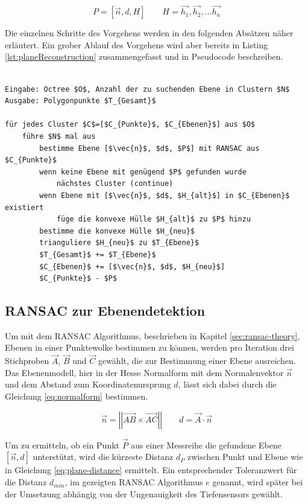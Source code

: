 \begin{equation} \label{eq:plane}
P=\left[\vec{n}, d, H\right] \qquad H=\vec{h_1}, \vec{h_2}, \ldots  \vec{h_n}
\end{equation}

Die einzelnen Schritte des Vorgehens werden in den folgenden Absätzen näher erläutert. Ein grober Ablauf des Vorgehens wird aber bereits in Listing \ref{lst:planeReconstruction} zusammengefasst und in Pseudocode beschreiben. 

\begin{lstlisting}[mathescape,caption=Planare Echtzeitrekonstruktion, label=lst:planeReconstruction, float=htbp]

Eingabe: Octree $O$, Anzahl der zu suchenden Ebene in Clustern $N$
Ausgabe: Polygonpunkte $T_{Gesamt}$

für jedes Cluster $C$=[$C_{Punkte}$, $C_{Ebenen}$] aus $O$
    führe $N$ mal aus
        bestimme Ebene [$\vec{n}$, $d$, $P$] mit RANSAC aus $C_{Punkte}$
        wenn keine Ebene mit genügend $P$ gefunden wurde
            nächstes Cluster (continue)
        wenn Ebene mit [$\vec{n}$, $d$, $H_{alt}$] in $C_{Ebenen}$ existiert	
            füge die konvexe Hülle $H_{alt}$ zu $P$ hinzu	
        bestimme die konvexe Hülle $H_{neu}$
        trianguliere $H_{neu}$ zu $T_{Ebene}$
        $T_{Gesamt}$ += $T_{Ebene}$
        $C_{Ebenen}$ += [$\vec{n}$, $d$, $H_{neu}$]
        $C_{Punkte}$ - $P$
\end{lstlisting}


\subsection{RANSAC zur Ebenendetektion} \label{sec:ransac}

Um mit dem RANSAC Algorithmus, beschrieben in Kapitel \ref{sec:ransac-theory}, Ebenen in einer Punktewolke bestimmen zu können, werden pro Iteration drei Stichproben \(\vec{A}\), \(\vec{B}\) und \(\vec{C}\) gewählt, die zur Bestimmung einer Ebene ausreichen. Das Ebenenmodell, hier in der Hesse Normalform mit dem Normalenvektor \(\vec{n}\) und dem Abstand zum Koordinatenursprung \(d\), lässt sich dabei durch die Gleichung \ref{eq:normalform} bestimmen.

\begin{equation}\label{eq:normalform}
\vec{n} =\left|\left| \vec{AB} \times \vec{AC}\right|\right|
\qquad
d = \vec{A} \cdot \vec{n}
\end{equation}

Um zu ermitteln, ob ein Punkt \(\vec{P}\) aus einer Messreihe die gefundene Ebene \(\left[\vec{n}, d\right]\) unterstützt, wird die kürzeste Distanz \(d_P\) zwischen Punkt und Ebene wie in Gleichung \ref{eq:plane-distance} ermittelt.  Ein entsprechender Toleranzwert für die Distanz \(d_{min}\), im gezeigten RANSAC Algorithmus \(e\) genannt, wird später bei der Umsetzung abhängig von der Ungenauigkeit des Tiefensensors gewählt. 

